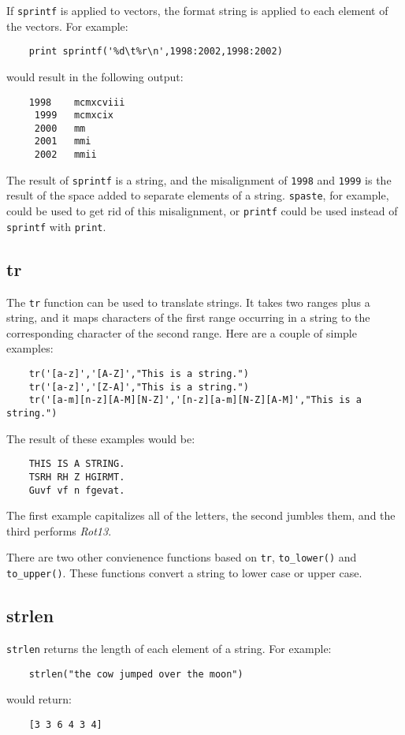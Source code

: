 If {\tt sprintf} is applied to vectors, the format string is applied to each
element of the vectors. For example:
\begin{verbatim}
    print sprintf('%d\t%r\n',1998:2002,1998:2002)
\end{verbatim}
would result in the following output:
\begin{verbatim}
    1998    mcmxcviii
     1999   mcmxcix
     2000   mm
     2001   mmi
     2002   mmii
\end{verbatim}
The result of {\tt sprintf} is a string, and the misalignment of {\tt 1998}
and {\tt 1999} is the result of the space added to separate elements of a string.
{\tt spaste}, for example, could be used to get rid of this misalignment, or
{\tt printf} could be used instead of {\tt sprintf} with {\tt print}.

\subsection{tr}
\label{tr-func}

The {\tt tr} function can be used to translate strings. It takes two ranges plus a string,
and it maps characters of the first range occurring in a string to the corresponding character
of the second range. Here are a couple of simple examples:
\begin{verbatim}
    tr('[a-z]','[A-Z]',"This is a string.")
    tr('[a-z]','[Z-A]',"This is a string.") 
    tr('[a-m][n-z][A-M][N-Z]','[n-z][a-m][N-Z][A-M]',"This is a string.")
\end{verbatim}
The result of these examples would be:
\begin{verbatim}
    THIS IS A STRING. 
    TSRH RH Z HGIRMT. 
    Guvf vf n fgevat.
\end{verbatim}
The first example capitalizes all of the letters, the second jumbles them, and
the third performs {\em Rot13}.

\label{to_lower-func}
\label{to_upper-func}
There are two other convienence functions based on {\tt tr}, {\tt to\_lower()} and
{\tt to\_upper()}. These functions convert a string to lower case or upper case.

\subsection{strlen}
\label{strlen-func}
{\tt strlen} returns the length of each element of a string. For example:
\begin{verbatim}
    strlen("the cow jumped over the moon")
\end{verbatim}
would return:
\begin{verbatim}
    [3 3 6 4 3 4]
\end{verbatim}

